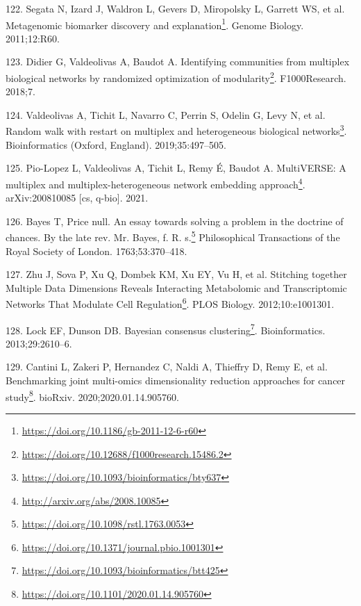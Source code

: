 \documentclass[
  a4paper,
]{book}
\DeclareRobustCommand{\href}[2]{#2\footnote{\url{#1}}}
\newlength{\cslhangindent}
\newlength{\cslentryspacingunit} %
\newenvironment{CSLReferences}[2] %
 {%
  \setlength{\parindent}{0pt}
  \ifodd #1
  \let\oldpar\par
  \def\par{\hangindent=\cslhangindent\oldpar}
  \fi
  \setlength{\parskip}{#2\cslentryspacingunit}
 }%
 {}
\begin{document}
\begin{CSLReferences}{0}{0}
\leavevmode{}%
122. Segata N, Izard J, Waldron L, Gevers D, Miropolsky L, Garrett WS, et al. \href{https://doi.org/10.1186/gb-2011-12-6-r60}{Metagenomic biomarker discovery and explanation}. Genome Biology. 2011;12:R60.

\leavevmode{}%
123. Didier G, Valdeolivas A, Baudot A. \href{https://doi.org/10.12688/f1000research.15486.2}{Identifying communities from multiplex biological networks by randomized optimization of modularity}. F1000Research. 2018;7.

\leavevmode{}%
124. Valdeolivas A, Tichit L, Navarro C, Perrin S, Odelin G, Levy N, et al. \href{https://doi.org/10.1093/bioinformatics/bty637}{Random walk with restart on multiplex and heterogeneous biological networks}. Bioinformatics (Oxford, England). 2019;35:497--505.

\leavevmode{}%
125. Pio-Lopez L, Valdeolivas A, Tichit L, Remy É, Baudot A. \href{http://arxiv.org/abs/2008.10085}{MultiVERSE: A multiplex and multiplex-heterogeneous network embedding approach}. arXiv:200810085 {[}cs, q-bio{]}. 2021.

\leavevmode{}%
126. Bayes T, Price null. \href{https://doi.org/10.1098/rstl.1763.0053}{An essay towards solving a problem in the doctrine of chances. By the late rev. Mr. Bayes, f. R. s.} Philosophical Transactions of the Royal Society of London. 1763;53:370--418.

\leavevmode{}%
127. Zhu J, Sova P, Xu Q, Dombek KM, Xu EY, Vu H, et al. \href{https://doi.org/10.1371/journal.pbio.1001301}{Stitching together Multiple Data Dimensions Reveals Interacting Metabolomic and Transcriptomic Networks That Modulate Cell Regulation}. PLOS Biology. 2012;10:e1001301.

\leavevmode{}%
128. Lock EF, Dunson DB. \href{https://doi.org/10.1093/bioinformatics/btt425}{Bayesian consensus clustering}. Bioinformatics. 2013;29:2610--6.

\leavevmode{}%
129. Cantini L, Zakeri P, Hernandez C, Naldi A, Thieffry D, Remy E, et al. \href{https://doi.org/10.1101/2020.01.14.905760}{Benchmarking joint multi-omics dimensionality reduction approaches for cancer study}. bioRxiv. 2020;2020.01.14.905760.


\end{CSLReferences}
\end{document}
